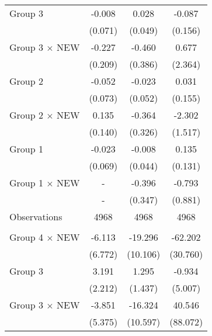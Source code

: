 {\begin{longtable}{l*{3}{c}}
Group 3 &   -0.008         &    0.028         &   -0.087         \\
                &  (0.071)         &  (0.049)         &  (0.156)         \\

Group 3 $\times$ NEW&   -0.227         &   -0.460         &    0.677         \\
                &  (0.209)         &  (0.386)         &  (2.364)         \\

Group 2 &   -0.052         &   -0.023         &    0.031         \\
                &  (0.073)         &  (0.052)         &  (0.155)         \\

Group 2 $\times$ NEW&    0.135         &   -0.364         &   -2.302         \\
                &  (0.140)         &  (0.326)         &  (1.517)         \\

Group 1 &   -0.023         &   -0.008         &    0.135         \\
                &  (0.069)         &  (0.044)         &  (0.131)         \\

Group 1 $\times$ NEW&    -         &   -0.396         &   -0.793         \\
                &      -        &  (0.347)         &  (0.881)         \\
\midrule
Observations    &     4968         &     4968         &     4968         \\
\midrule


\addlinespace
\multicolumn{4}{l}{\textit{Panel D: Cognitive Stimulation score (\%)}}\\
Group 4 $\times$ NEW&   -6.113         &  -19.296\sym{*}  &  -62.202\sym{**} \\
                &  (6.772)         & (10.106)         & (30.760)         \\

Group 3 &    3.191         &    1.295         &   -0.934         \\
                &  (2.212)         &  (1.437)         &  (5.007)         \\

Group 3 $\times$ NEW&   -3.851         &  -16.324         &   40.546         \\
                &  (5.375)         & (10.597)         & (88.072)         \\


\end{longtable}}
